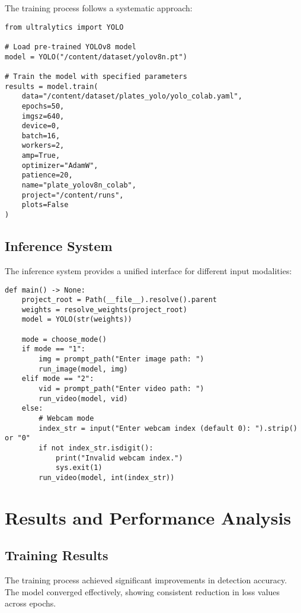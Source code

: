 \documentclass[12pt,a4paper]{article}
\begin{document}
The training process follows a systematic approach:

\begin{lstlisting}[caption=Training Implementation]
from ultralytics import YOLO

# Load pre-trained YOLOv8 model
model = YOLO("/content/dataset/yolov8n.pt")

# Train the model with specified parameters
results = model.train(
    data="/content/dataset/plates_yolo/yolo_colab.yaml",
    epochs=50,
    imgsz=640,
    device=0,
    batch=16,
    workers=2,
    amp=True,
    optimizer="AdamW",
    patience=20,
    name="plate_yolov8n_colab",
    project="/content/runs",
    plots=False
)
\end{lstlisting}

\subsection{Inference System}

The inference system provides a unified interface for different input modalities:

\begin{lstlisting}[caption=Main Detection Function]
def main() -> None:
    project_root = Path(__file__).resolve().parent
    weights = resolve_weights(project_root)
    model = YOLO(str(weights))

    mode = choose_mode()
    if mode == "1":
        img = prompt_path("Enter image path: ")
        run_image(model, img)
    elif mode == "2":
        vid = prompt_path("Enter video path: ")
        run_video(model, vid)
    else:
        # Webcam mode
        index_str = input("Enter webcam index (default 0): ").strip() or "0"
        if not index_str.isdigit():
            print("Invalid webcam index.")
            sys.exit(1)
        run_video(model, int(index_str))
\end{lstlisting}

\section{Results and Performance Analysis}

\subsection{Training Results}

The training process achieved significant improvements in detection accuracy. The model converged effectively, showing consistent reduction in loss values across epochs.
\end{document}
